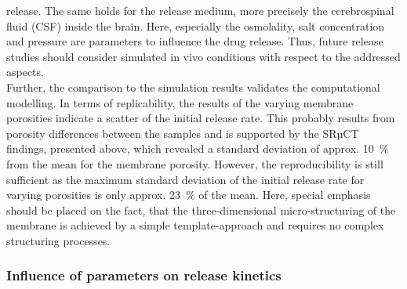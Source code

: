release. The same holds for the release medium, more precisely the cerebrospinal fluid (CSF) inside the brain. Here, especially the osmolality, salt concentration and pressure are parameters to influence the drug release. Thus, future release studies should consider simulated in vivo conditions with respect to the addressed aspects.  \\        
Further, the comparison to the simulation results validates the computational modelling. In terms of replicability, the results of the varying membrane porosities indicate a scatter of the initial release rate. This probably results from porosity differences between the samples and is supported by the SRµCT findings, presented above, which revealed a standard deviation of approx. 10~\% from the mean for the membrane porosity. However, the reproducibility is still sufficient as the maximum standard deviation of the initial release rate for varying porosities is only approx. 23~\% of the mean. Here, special emphasis should be placed on the fact, that the three-dimensional micro-structuring of the membrane is achieved by a simple template-approach and requires no complex structuring processes.

\subsubsection{Influence of parameters on release kinetics}

